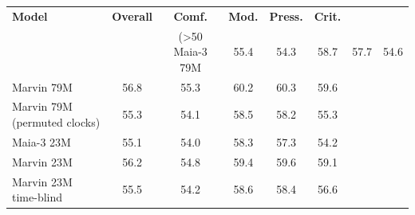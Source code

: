 \begin{tabular}{lccccc}
\hline
\textbf{Model} & \textbf{Overall} & \textbf{Comf.} & \textbf{Mod.} & \textbf{Press.} & \textbf{Crit.} \\
  & & (>50%
\hline
Maia-3 79M & 55.4 & 54.3 & 58.7 & 57.7 & 54.6 \\
Marvin 79M & 56.8 & 55.3 & 60.2 & 60.3 & 59.6 \\
Marvin 79M (permuted clocks) & 55.3 & 54.1 & 58.5 & 58.2 & 55.3 \\
Maia-3 23M & 55.1 & 54.0 & 58.3 & 57.3 & 54.2 \\
Marvin 23M & 56.2 & 54.8 & 59.4 & 59.6 & 59.1 \\
Marvin 23M time-blind & 55.5 & 54.2 & 58.6 & 58.4 & 56.6 \\
\hline
\end{tabular}
